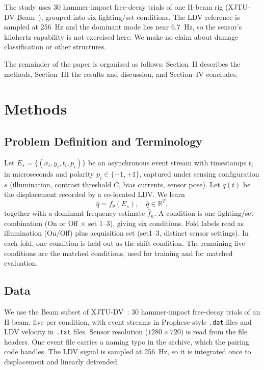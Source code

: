 \documentclass[conference]{IEEEtran}
\begin{document}
The study uses 30 hammer-impact free-decay trials of one H-beam rig (XJTU-DV-Beam~\cite{Li2026}), grouped into six lighting/set conditions. The LDV reference is sampled at 256~Hz and the dominant mode lies near 6.7~Hz, so the sensor's kilohertz capability is not exercised here. We make no claim about damage classification or other structures.

The remainder of the paper is organised as follows: Section~II describes the methods, Section~III the results and discussion, and Section~IV concludes.

\section{Methods}
\subsection{Problem Definition and Terminology}
Let $E_s = \{(x_i, y_i, t_i, p_i)\}$ be an asynchronous event stream with timestamps $t_i$ in microseconds and polarity $p_i \in \{-1, +1\}$, captured under sensing configuration $s$ (illumination, contrast threshold $C$, bias currents, sensor pose). Let $q(t)$ be the displacement recorded by a co-located LDV. We learn
\begin{equation}
\hat{q} = f_\theta(E_s), \quad \hat{q} \in \mathbb{R}^T,
\label{eq:map}
\end{equation}
together with a dominant-frequency estimate $\hat{f}_n$. A condition is one lighting/set combination (On or Off $\times$ set 1--3), giving six conditions. Fold labels read as illumination (On/Off) plus acquisition set (set1--3, distinct sensor settings). In each fold, one condition is held out as the shift condition. The remaining five conditions are the matched conditions, used for training and for matched evaluation.

\subsection{Data}
We use the Beam subset of XJTU-DV~\cite{Li2026,XJTU-DV-Beam}: 30 hammer-impact free-decay trials of an H-beam, five per condition, with event streams in Prophese-style \texttt{.dat} files and LDV velocity in \texttt{.txt} files. Sensor resolution ($1280\times720$) is read from the file headers. One event file carries a naming typo in the archive, which the pairing code handles. The LDV signal is sampled at 256~Hz, so it is integrated once to displacement and linearly detrended.
\end{document}
